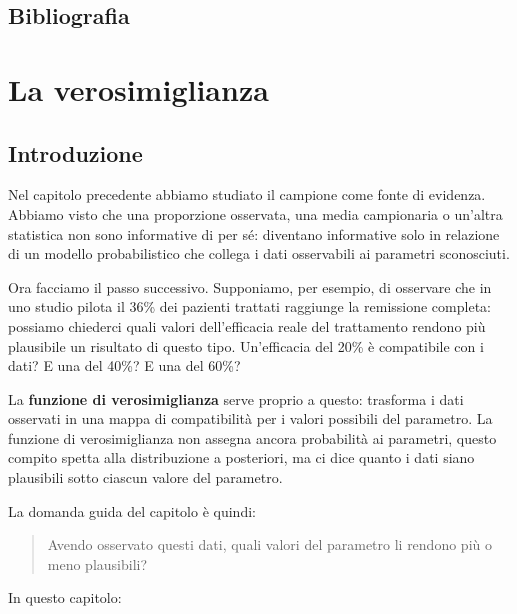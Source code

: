 \documentclass[
  italian,
  letterpaper,
  a4paper,
  11pt,
  open=any]{scrbook}
\theoremstyle{plain}
\theoremstyle{definition}
\theoremstyle{definition}
\theoremstyle{remark}
\begin{document}
\section*{Bibliografia}\label{bibliografia-7}


\chapter{La verosimiglianza}\label{sec-prob-likelihood}

\section*{Introduzione}\label{introduzione-13}


Nel capitolo precedente abbiamo studiato il campione come fonte di
evidenza. Abbiamo visto che una proporzione osservata, una media
campionaria o un'altra statistica non sono informative di per sé:
diventano informative solo in relazione di un modello probabilistico che
collega i dati osservabili ai parametri sconosciuti.

Ora facciamo il passo successivo. Supponiamo, per esempio, di osservare
che in uno studio pilota il 36\% dei pazienti trattati raggiunge la
remissione completa: possiamo chiederci quali valori dell'efficacia
reale del trattamento rendono più plausibile un risultato di questo
tipo. Un'efficacia del 20\% è compatibile con i dati? E una del 40\%? E
una del 60\%?

La \textbf{funzione di verosimiglianza} serve proprio a questo:
trasforma i dati osservati in una mappa di compatibilità per i valori
possibili del parametro. La funzione di verosimiglianza non assegna
ancora probabilità ai parametri, questo compito spetta alla
distribuzione a posteriori, ma ci dice quanto i dati siano plausibili
sotto ciascun valore del parametro.

La domanda guida del capitolo è quindi:

\begin{quote}
Avendo osservato questi dati, quali valori del parametro li rendono più
o meno plausibili?
\end{quote}

In questo capitolo:
\end{document}
